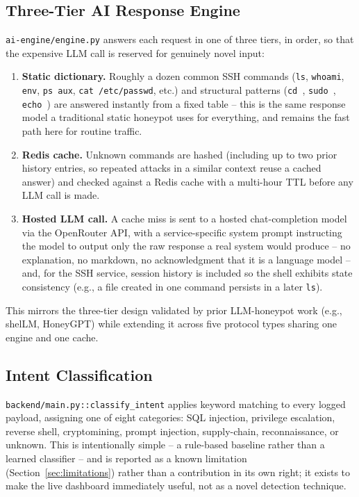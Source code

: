 \documentclass[conference]{IEEEtran}
\begin{document}
\subsection{Three-Tier AI Response Engine}

\texttt{ai-engine/engine.py} answers each request in one of three tiers, in
order, so that the expensive LLM call is reserved for genuinely novel input:

\begin{enumerate}
\item \textbf{Static dictionary.} Roughly a dozen common SSH commands
(\texttt{ls}, \texttt{whoami}, \texttt{env}, \texttt{ps aux},
\texttt{cat /etc/passwd}, etc.) and structural patterns (\texttt{cd },
\texttt{sudo }, \texttt{echo }) are answered instantly from a fixed table --
this is the same response model a traditional static honeypot uses for
everything, and remains the fast path here for routine traffic.
\item \textbf{Redis cache.} Unknown commands are hashed (including up to two
prior history entries, so repeated attacks in a similar context reuse a
cached answer) and checked against a Redis cache with a multi-hour TTL
before any LLM call is made.
\item \textbf{Hosted LLM call.} A cache miss is sent to a hosted
chat-completion model via the OpenRouter API, with a service-specific system
prompt instructing the model to output only the raw response a real system
would produce -- no explanation, no markdown, no acknowledgment that it is a
language model -- and, for the SSH service, session history is included so
the shell exhibits state consistency (e.g., a file created in one command
persists in a later \texttt{ls}).
\end{enumerate}

This mirrors the three-tier design validated by prior LLM-honeypot work
(e.g., shelLM, HoneyGPT) while extending it across five protocol types
sharing one engine and one cache.

\subsection{Intent Classification}

\texttt{backend/main.py::classify\_intent} applies keyword matching to every
logged payload, assigning one of eight categories: SQL injection, privilege
escalation, reverse shell, cryptomining, prompt injection, supply-chain,
reconnaissance, or unknown. This is intentionally simple -- a rule-based
baseline rather than a learned classifier -- and is reported as a known
limitation (Section~\ref{sec:limitations}) rather than a contribution in its
own right; it exists to make the live dashboard immediately useful, not as a
novel detection technique.
\end{document}
